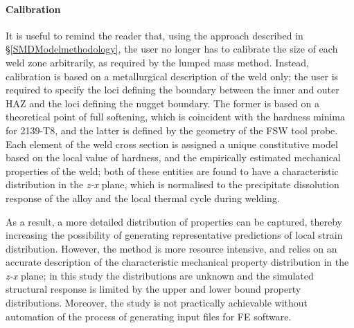 \paragraph{Calibration}
\label{SMDModellingstudyDiscussionPropertydistributionsCalibration}
It is useful to remind the reader that, using the approach described in \S\ref{SMDModelmethodology}, the user no longer has to calibrate the size of each weld zone arbitrarily, as required by the lumped mass method. Instead, calibration is based on a metallurgical description of the weld only; the user is required to specify the loci defining the boundary between the inner and outer HAZ and the loci defining the nugget boundary. The former is based on a theoretical point of full softening, which is coincident with the hardness minima for 2139-T8, and the latter is defined by the geometry of the FSW tool probe. Each element of the weld cross section is assigned a unique constitutive model based on the local value of hardness, and the empirically estimated mechanical properties of the weld; both of these entities are found to have a characteristic distribution in the \textit{z-x} plane, which is normalised to the precipitate dissolution response of the alloy and the local thermal cycle during welding. 

As a result, a more detailed distribution of properties can be captured, thereby increasing the possibility of generating representative predictions of local strain distribution. However, the method is more resource intensive, and relies on an accurate description of the characteristic mechanical property distribution in the \textit{z-x} plane; in this study the distributions are unknown and the simulated structural response is limited by the upper and lower bound property distributions. Moreover, the study is not practically achievable without automation of the process of generating input files for FE software. 

